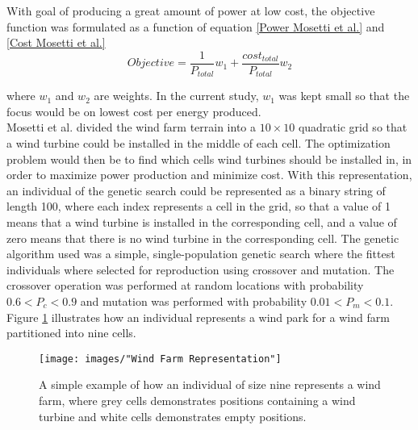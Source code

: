 \noindent With goal of producing a great amount of power at low cost, the objective function was formulated as a function of equation \ref{Power Mosetti et al.} and \ref{Cost Mosetti et al.}\\


\begin{equation}
Objective = \frac{1}{P_{total}}w_1 + \frac{cost_{total}}{P_{total}}w_2
\label{Objective function Mosetti et al.}
\end{equation}


\noindent where $w_1$ and $w_2$ are weights. In the current study, $w_1$ was kept small so that the focus would be on lowest cost per energy produced. \\

\noindent Mosetti et al. divided the wind farm terrain into a $10\times10$ quadratic grid so that a wind turbine could be installed in the middle of each cell. The optimization problem would then be to find which cells wind turbines should be installed in, in order to maximize power production and minimize cost. With this representation, an individual of the genetic search could be represented as a binary string of length 100, where each index represents a cell in the grid, so that a value of 1 means that a wind turbine is installed in the corresponding cell, and a value of zero means that there is no wind turbine in the corresponding cell. The genetic algorithm used was a simple, single-population genetic search where the fittest individuals where selected for reproduction using crossover and mutation. The crossover operation was performed at random locations with probability $0.6 < P_c < 0.9$ and mutation was performed with probability $0.01 < P_m < 0.1$. Figure \ref{Wind Farm Representation} illustrates how an individual represents a wind park for a wind farm partitioned into nine cells.\\


\begin{figure}[h!]
\begin{center}
\texttt{[image: images/"Wind Farm Representation"]}
\caption{A simple example of how an individual of size nine represents a wind farm, where grey cells demonstrates positions containing a wind turbine and white cells demonstrates empty positions. }
\label{Wind Farm Representation}
\end{center}
\end{figure}



